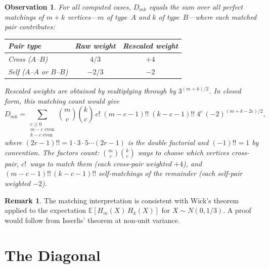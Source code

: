 \documentclass[11pt,a4paper]{article}
\theoremstyle{definition}
\newtheorem{remark}[definition]{Remark}
\theoremstyle{plain}
\newtheorem{observation}[definition]{Observation}
\begin{document}
\begin{observation}\label{obs:matching}
For all computed cases, $D_{mk}$ equals the sum over all perfect
matchings of $m + k$ vertices---$m$ of type~$A$ and $k$ of
type~$B$---where each matched pair contributes:
\begin{center}
\small
\begin{tabular}{lcc}
  \toprule
  Pair type & Raw weight & Rescaled weight \\
  \midrule
  Cross ($A$--$B$) & $4/3$ & $+4$ \\
  Self ($A$--$A$ or $B$--$B$) & $-2/3$ & $-2$ \\
  \bottomrule
\end{tabular}
\end{center}
Rescaled weights are obtained by multiplying through by $3^{(m+k)/2}$.
In closed form, this matching count would give
\begin{equation}\label{eq:Dmk-matching}
  D_{mk} = \sum_{\substack{c \ge 0 \\ m - c \text{ even} \\
  k - c \text{ even}}}
  \binom{m}{c}\binom{k}{c}\, c!\;
  (m - c - 1)!!\; (k - c - 1)!!\; 4^{c}\, (-2)^{(m+k-2c)/2},
\end{equation}
where $(2r-1)!! = 1 \cdot 3 \cdot 5 \cdots (2r-1)$ is the double
factorial and $(-1)!! = 1$ by convention. The factors count:
$\binom{m}{c}\binom{k}{c}$ ways to choose which vertices cross-pair,
$c!$~ways to match them (each cross-pair weighted $+4$), and
$(m - c - 1)!!\,(k - c - 1)!!$ self-matchings of the remainder
(each self-pair weighted $-2$).
\end{observation}

\begin{remark}
The matching interpretation is consistent with Wick's
theorem applied to the expectation
$\mathbb{E}[H_m(X)\,H_k(X)]$ for $X \sim N(0, 1/3)$.
A proof would follow from Isserlis' theorem at non-unit
variance.
\end{remark}

\section{The Diagonal}
\end{document}
